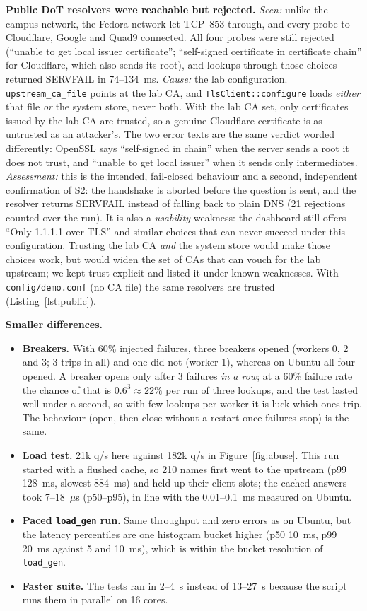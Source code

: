 \documentclass[11pt,a4paper]{article}
\newcommand{\code}[1]{\texttt{#1}}
\begin{document}
\textbf{Public DoT resolvers were reachable but rejected.}
\emph{Seen:} unlike the campus network, the Fedora network let TCP~853 through, and every probe to Cloudflare,
Google and Quad9 connected. All four probes were still rejected (``unable to get local issuer certificate'';
``self-signed certificate in certificate chain'' for Cloudflare, which also sends its root), and lookups through
those choices returned SERVFAIL in 74--134~ms. \emph{Cause:} the lab configuration. \code{upstream\_ca\_file}
points at the lab CA, and \code{TlsClient::configure} loads \emph{either} that file \emph{or} the system store,
never both. With the lab CA set, only certificates issued by the lab CA are trusted, so a genuine Cloudflare
certificate is as untrusted as an attacker's. The two error texts are the same verdict worded differently:
OpenSSL says ``self-signed in chain'' when the server sends a root it does not trust, and ``unable to get local
issuer'' when it sends only intermediates. \emph{Assessment:} this is the intended, fail-closed behaviour and a
second, independent confirmation of S2: the handshake is aborted before the question is sent, and the
resolver returns SERVFAIL instead of falling back to plain DNS (21 rejections counted over the run). It is
also a \emph{usability} weakness: the dashboard still offers ``Only 1.1.1.1 over TLS'' and similar choices that
can never succeed under this configuration. Trusting
the lab CA \emph{and} the system store would make those choices work, but would widen the set of CAs that can
vouch for the lab upstream; we kept trust explicit and listed it under known weaknesses. With
\code{config/demo.conf} (no CA file) the same resolvers are trusted (Listing~\ref{lst:public}).

\textbf{Smaller differences.}
\begin{itemize}
  \item \textbf{Breakers.} With 60\% injected failures, three breakers opened (workers 0, 2 and 3; 3 trips in
  all) and one did not (worker 1), whereas on Ubuntu all four opened. A breaker opens only after 3 failures
  \emph{in a row}; at a 60\% failure rate the chance of that is $0.6^3 \approx 22\%$ per run of three lookups,
  and the test lasted well under a second, so with few lookups per worker it is luck which ones trip. The
  behaviour (open, then close without a restart once failures stop) is the same.
  \item \textbf{Load test.} 21k q/s here against 182k q/s in Figure~\ref{fig:abuse}. This run started with a
  flushed cache, so 210 names first went to the upstream (p99 128~ms, slowest 884~ms) and held up their client
  slots; the cached answers took 7--18~$\mu$s (p50--p95), in line with the 0.01--0.1~ms measured on Ubuntu.
  \item \textbf{Paced \code{load\_gen} run.} Same throughput and zero errors as on Ubuntu, but the latency
  percentiles are one histogram bucket higher (p50 10~ms, p99 20~ms against 5 and 10~ms), which is within the
  bucket resolution of \code{load\_gen}.
  \item \textbf{Faster suite.} The tests ran in 2--4~s instead of 13--27~s because the script runs them in
  parallel on 16 cores.
\end{itemize}
\end{document}
